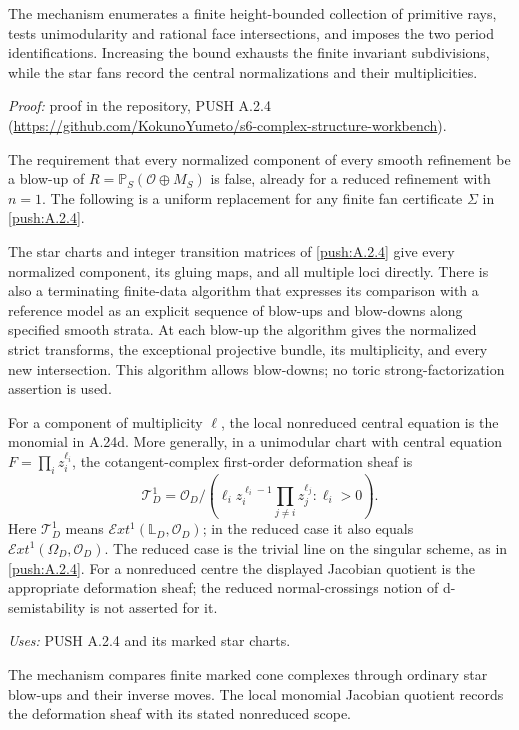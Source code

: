 The mechanism enumerates a finite height-bounded collection of primitive rays, tests unimodularity and rational face intersections, and imposes the two period identifications. Increasing the bound exhausts the finite invariant subdivisions, while the star fans record the central normalizations and their multiplicities.

\noindent\emph{Proof:} proof in the repository, PUSH A.2.4 (\url{https://github.com/KokunoYumeto/s6-complex-structure-workbench}).

\begin{announcement}[PUSH A.2.5; A]\label{push:A.2.5}
The requirement that every normalized component of every
smooth refinement be a blow-up of
$R=\mathbb P_S(\mathcal O\oplus M_S)$ is false, already
for a reduced refinement with $n=1$.
The following is a uniform replacement for any finite
fan certificate $\Sigma$ in \ref{push:A.2.4}.

The star charts and integer transition matrices of \ref{push:A.2.4}
give every normalized component, its gluing maps, and
all multiple loci directly. There is also a terminating
finite-data algorithm that expresses its comparison
with a reference model as an explicit sequence of
blow-ups and blow-downs along specified smooth strata.
At each blow-up the algorithm gives the normalized
strict transforms, the exceptional projective bundle,
its multiplicity, and every new intersection.
This algorithm allows blow-downs; no toric
strong-factorization assertion is used.

For a component of multiplicity $\ell$, the local
nonreduced central equation is the monomial in A.24d.
More generally, in a unimodular chart with central
equation $F=\prod_i z_i^{\ell_i}$, the cotangent-complex
first-order deformation sheaf is
\[
 \mathcal T^1_D
  =\mathcal O_D\Big/
    \left(\ell_i z_i^{\ell_i-1}
          \prod_{j\ne i}z_j^{\ell_j}:\ell_i>0\right).
 \tag{A.25a}
\]
Here $\mathcal T^1_D$ means
$\mathcal Ext^1(\mathbb L_D,\mathcal O_D)$; in the
reduced case it also equals
$\mathcal Ext^1(\Omega_D,\mathcal O_D)$.
The reduced case is the trivial line on the singular
scheme, as in \ref{push:A.2.4}. For a nonreduced centre the displayed
Jacobian quotient is the appropriate deformation sheaf;
the reduced normal-crossings notion of d-semistability
is not asserted for it.
\end{announcement}
\noindent\emph{Uses:} PUSH A.2.4 and its marked star charts.\par

The mechanism compares finite marked cone complexes through ordinary star blow-ups and their inverse moves. The local monomial Jacobian quotient records the deformation sheaf with its stated nonreduced scope.

